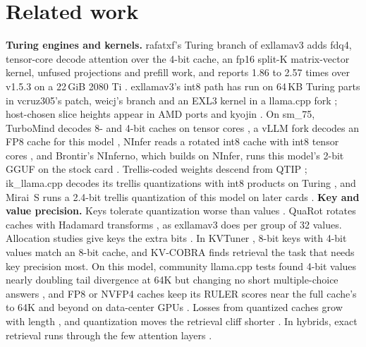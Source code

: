 \documentclass[11pt,letterpaper]{article}
\begin{document}
\section{Related work}
\label{sec:related}
\textbf{Turing engines and kernels.} rafatxf's Turing branch of exllamav3
adds fdq4, tensor-core decode attention over the 4-bit cache, an fp16 split-K
matrix-vector kernel, unfused projections and prefill work, and reports 1.86
to 2.57 times over v1.5.3 on a 22\,GiB 2080 Ti \citep{rafatxf2026turing}. exllamav3's int8 path has run
on 64\,KB Turing parts in vcruz305's patch, weicj's branch and an EXL3 kernel
in a llama.cpp fork \citep{vcruz3052026exl3turing,weicj2026turing,spiritbuun2026buun};
host-chosen slice heights appear in AMD ports and kyojin
\citep{ghazni2026rocm,yamz2026kyojin}. On sm\_75, TurboMind decodes 8- and
4-bit caches on tensor cores \citep{lmdeploy2024turbomind}, a vLLM fork
decodes an FP8 cache for this model \citep{cookjohn2026vllmturing}, NInfer
reads a rotated int8 cache with int8 tensor cores \citep{ninfer2026titan},
and Brontir's NInferno, which builds on NInfer, runs this model's 2-bit GGUF on the stock
card \citep{brontir2026ninferno}.
Trellis-coded weights descend from QTIP \citep{tseng2024qtip};
ik\_llama.cpp decodes its trellis quantizations with int8 products on Turing
\citep{ikawrakow2025ikllama}, and Mirai~S runs a 2.4-bit trellis quantization
of this model on later cards \citep{trymirai2026mirais}. \textbf{Key and value precision.} Keys tolerate quantization worse than
values \citep{liu2024kivi,hooper2024kvquant}. QuaRot rotates caches with
Hadamard transforms \citep{ashkboos2024quarot}, as exllamav3 does per group of
32 values. Allocation studies give keys the extra bits
\citep{dong2024qaq,tao2024asymkv,zhang2024diffkv,hariri2026quantize}. In
KVTuner \citep{li2025kvtuner}, 8-bit keys with 4-bit values match an 8-bit
cache, and KV-COBRA \citep{ha2026kvcobra} finds retrieval the task that needs
key precision most. On this model, community llama.cpp tests found 4-bit
values nearly doubling tail divergence at 64K \citep{llamacpp23470} but
changing no short multiple-choice answers \citep{churnharness2026}, and FP8 or
NVFP4 caches keep its RULER scores near the full cache's to 64K and beyond on
data-center GPUs \citep{kozyrev2026gdn,tang2026jetqsparse}. Losses from
quantized caches grow with length \citep{li2024evaluating}, and quantization
moves the retrieval cliff shorter \citep{salammagari2026length}. In hybrids,
exact retrieval runs through the few attention layers
\citep{afendulev2026hybrid,bick2025gather}.
\end{document}
